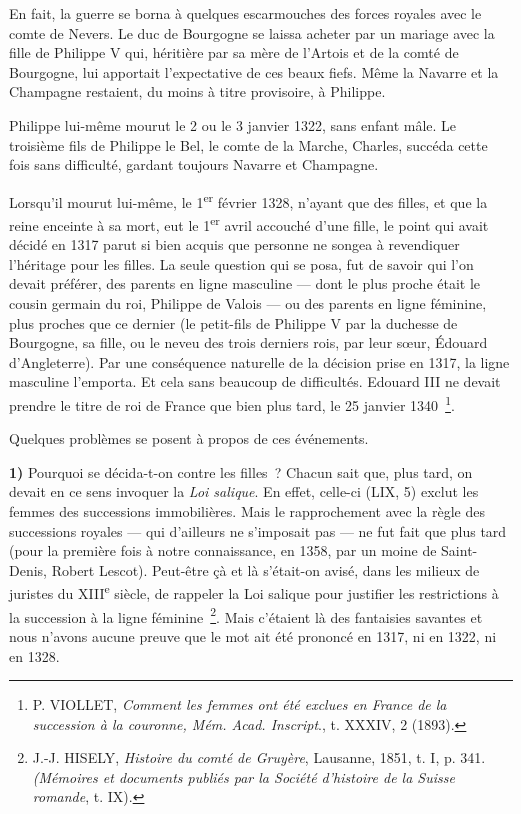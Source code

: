 \documentclass[french,twoside]{book} %
\newcommand{\labelchar}[1]{\textbf{\color{rubric} #1}}
\begin{document}
\noindent En fait, la guerre se borna à quelques escarmouches des forces royales avec le comte de Nevers. Le duc de Bourgogne se laissa acheter par un mariage avec la fille de Philippe V qui, héritière par sa mère de l’Artois et de la comté de Bourgogne, lui apportait l’expectative de ces beaux fiefs. Même la Navarre et la Champagne restaient, du moins à titre provisoire, à Philippe.\par
Philippe lui-même mourut le 2 ou le 3 janvier 1322, sans enfant mâle. Le troisième fils de Philippe le Bel, le comte de la Marche, Charles, succéda cette fois sans difficulté, gardant toujours Navarre et Champagne.\par
Lorsqu’il mourut lui-même, le 1\textsuperscript{er} février 1328, n’ayant que des filles, et que la reine enceinte à sa mort, eut le 1­\textsuperscript{er} avril accouché d’une fille, le point qui avait décidé en 1317 parut si bien acquis que personne ne songea à revendiquer l’héritage pour les filles. La seule question qui se posa, fut de savoir qui l’on devait préférer, des parents en ligne masculine — dont le plus proche était le cousin germain du roi, Philippe de Valois — ou des parents en ligne féminine, plus proches que ce dernier (le petit-fils de Philippe V par la duchesse de Bourgogne, sa fille, ou le neveu des trois derniers rois, par leur sœur, Édouard d’Angleterre). Par une conséquence naturelle de la décision prise en 1317, la ligne masculine l’emporta. Et cela sans beaucoup de difficultés. Edouard III ne devait prendre le titre de roi de France que bien plus tard, le 25 janvier 1340 \footnote{ P. VIOLLET, {\itshape Comment les femmes ont été exclues en France de la succession à la couronne, Mém. Acad. Inscript}., t. XXXIV, 2 (1893).}.\par
Quelques problèmes se posent à propos de ces événements.\par
\bigbreak
\noindent \labelchar{1)} Pourquoi se décida-t-on contre les filles ? Chacun sait que, plus tard, on devait en ce sens invoquer la \emph{Loi salique}. En effet, celle-ci (LIX, 5) exclut les femmes des successions immobilières. Mais le rapprochement avec la règle des successions royales — qui d’ailleurs ne s’imposait pas — ne fut fait que plus tard (pour la première fois à notre connaissance, en 1358, par un moine de Saint-Denis, Robert Lescot). Peut-être çà et là s’était-on avisé, dans les milieux de juristes du XIII\textsuperscript{e} siècle, de rappeler la Loi salique pour justifier les restrictions à la succession à la ligne féminine \footnote{ J.-J. HISELY, {\itshape Histoire du comté de Gruyère}, Lausanne, 1851, t. I, p. 341. {\itshape (Mémoires et documents publiés par la Société d’histoire de la Suisse romande}, t. IX).}. Mais c’étaient là des fantaisies savantes et nous n’avons aucune preuve que le mot ait été prononcé en 1317, ni en 1322, ni en 1328.\par
\end{document}
